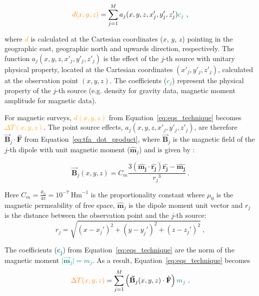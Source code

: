 \begin{equation}
\label{eq:eqs_technique}
\textcolor{orange}{d (x, y, z)} = \sum_{j=1}^{M} a_j(x, y, z, x'_j, y'_j , z'_j) \textcolor{teal}{c_j}
\ ,
\end{equation}

\noindent
where \textcolor{orange}{$d$} is calculated at the Cartesian coordinates ($x$, $y$, $z$) pointing in the geographic east, geographic north and upwards direction, respectively. The function $a_j(x, y, z, x'_j, y'_j , z'_j)$ is the effect of the $j$-th source with unitary physical property, located at the Cartesian coordinates $(x'_j, y'_j, z'_j)$, calculated at the observation point $(x, y, z)$. The coefficients (\textcolor{teal}{$c_j$}) represent the physical property of the $j$-th source 
(e.g. density for gravity data, magnetic moment amplitude for magnetic data).

For magnetic surveys, \textcolor{orange}{$d (x, y, z)$} from Equation~\ref{eq:eqs_technique} becomes \textcolor{orange}{$\Delta T(x, y, z)$}. The point source effects, $a_j(x, y, z, x'_j, y'_j , z'_j)$, are therefore $\vec{\mathbf{B}}_j \cdot \hat{\mathbf{F}}$ from Equation~\ref{eq:tfa_dot_product}, where $\vec{\mathbf{B}}_j$ is the magnetic field of the $j$-th dipole with unit magnetic moment ($\hat{\mathbf{m}}_j$) and is given by \citep{Blakley1995}:

\begin{equation}
    \vec{\mathbf{B}}_j (x, y, z) = C_m \dfrac{3 \left( \hat{\mathbf{m_j}} \cdot \hat{\mathbf{r_j}} \right) \hat{\mathbf{r_j}} - \hat{\mathbf{m_j}}}{{r_j}^3}
    \ .
    \label{eq:magnetic_field}
\end{equation}

\noindent
Here $C_m = \frac{\mu_0}{4 \pi} = 10^{-7} \ \text{Hm}^{-1}$ is the proportionality constant where $\mu_0$ is the magnetic permeability of free space, $\hat{\mathbf{m}}_j$ is the dipole moment unit vector and $r_j$ is the distance between the observation point and the $j$-th source:
\begin{equation}
    r_j = \sqrt{(x - x_j')^2 + (y - y_j')^2 + (z - z_j')^2}
    \ ,
\end{equation}
 

The coefficients (\textcolor{teal}{$\mathbf{c_j}$}) from Equation~\ref{eq:eqs_technique} are the norm of the magnetic moment \textcolor{teal}{$\vert \vec{\mathbf{m}}_j \vert = m_j$}. As a result, Equation~\ref{eq:eqs_technique} becomes
\begin{equation}
\label{eq:tfa_eqs}
\textcolor{orange}{\Delta T (x, y, z)} = \sum_{j=1}^{M} \left(\vec{\mathbf{B}}_j(x, y, z) \cdot \hat{\mathbf{F}}\right) \textcolor{teal}{m_j}
\ .
\end{equation}

